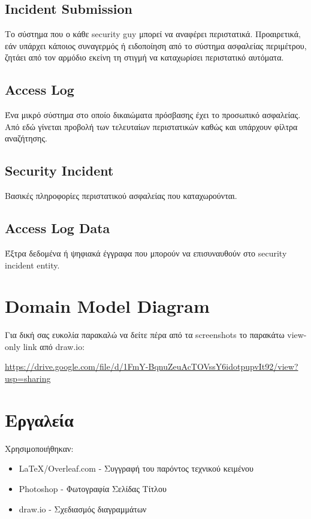 \documentclass{article}
\begin{document}
\subsection{Incident Submission}
Το σύστημα που ο κάθε security guy μπορεί να αναφέρει περιστατικά. Προαιρετικά, εάν υπάρχει κάποιος συναγερμός ή ειδοποίηση από το σύστημα ασφαλείας περιμέτρου, ζητάει από τον αρμόδιο εκείνη τη στιγμή να καταχωρίσει περιστατικό αυτόματα.
\subsection{Access Log}
Ένα μικρό σύστημα στο οποίο δικαιώματα πρόσβασης έχει το προσωπικό ασφαλείας. Από εδώ γίνεται προβολή των τελευταίων περιστατικών καθώς και υπάρχουν φίλτρα αναζήτησης.
\subsection{Security Incident}
Βασικές πληροφορίες περιστατικού ασφαλείας που καταχωρούνται.
\subsection{Access Log Data}
Έξτρα δεδομένα ή ψηφιακά έγγραφα που μπορούν να επισυναυθούν στο security incident entity.

\section{Domain Model Diagram}
Για δική σας ευκολία παρακαλώ να δείτε πέρα από τα screenshots το παρακάτω view-only link από draw.io:

\url{https://drive.google.com/file/d/1FmY-BqnuZeuAcTOVssY6idotpupvIt92/view?usp=sharing}

\noindent{}
\newpage

\newpage

\section{Εργαλεία}
Χρησιμοποιήθηκαν:
\begin{itemize}
    \item \LaTeX/Overleaf.com - Συγγραφή του παρόντος τεχνικού κειμένου
    \item Photoshop - Φωτογραφία Σελίδας Τίτλου
    \item draw.io - Σχεδιασμός διαγραμμάτων
\end{itemize}
\end{document}
